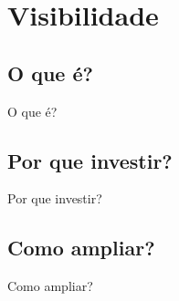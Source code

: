 \section{Visibilidade}
\label{s.visibility}

\subsection{O que é?}
\label{ss.what_visibility}

\begin{frame}{O que é?}
\end{frame}

\subsection{Por que investir?}
\label{ss.why_visibility}

\begin{frame}{Por que investir?}
\end{frame}

\subsection{Como ampliar?}
\label{ss.how_visibility}

\begin{frame}{Como ampliar?}
\end{frame}